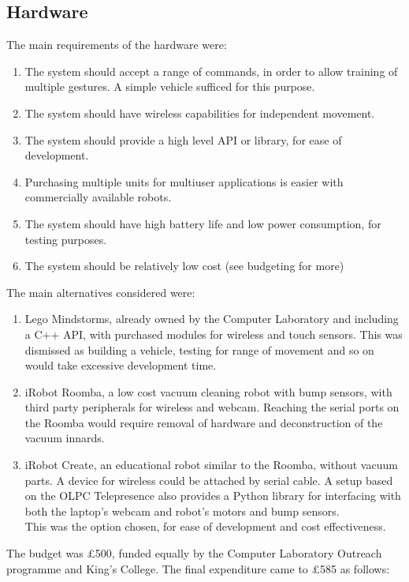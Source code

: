 \documentclass[12pt,a4,notitlepage]{report}
\renewcommand{\_}{\texttt{\symbol{95}}}
\newcommand{\<}{\texttt{\symbol{60}}}
\renewcommand{\>}{\texttt{\symbol{62}}}
\begin{document}
\subsection{Hardware}

The main requirements of the hardware were:

\begin{enumerate}
\item The system should accept a range of commands, in order to allow training of multiple gestures. A simple vehicle sufficed for this purpose.
\item The system should have wireless capabilities for independent movement.
\item The system should provide a high level API or library, for ease of development.
\item Purchasing multiple units for multiuser applications is easier with commercially available robots.
\item The system should have high battery life and low power consumption, for testing purposes.
\item The system should be relatively low cost (see budgeting for more)
\end{enumerate}

The main alternatives considered were:
\begin{enumerate}
\item Lego Mindstorms, already owned by the Computer Laboratory and including a C++ API, with purchased modules for wireless and touch sensors. This was dismissed as building a vehicle, testing for range of movement and so on would take excessive development time.
\item iRobot Roomba, a low cost vacuum cleaning robot with bump sensors, with third party peripherals for wireless and webcam. Reaching the serial ports on the Roomba would require removal of hardware and deconstruction of the vacuum innards.
\item iRobot Create\cite{Create}, an educational robot similar to the Roomba, without vacuum parts. A device for wireless could be attached by serial cable. A setup based on the OLPC Telepresence\cite{OLPCtelepresence} also provides a Python library for interfacing with both the laptop's webcam and robot's motors and bump sensors. \\
This was the option chosen, for ease of development and cost effectiveness.
\end{enumerate}

The budget was \pounds 500, funded equally by the Computer Laboratory Outreach programme and King's College. The final expenditure came to \pounds 585 as follows:
\end{document}
